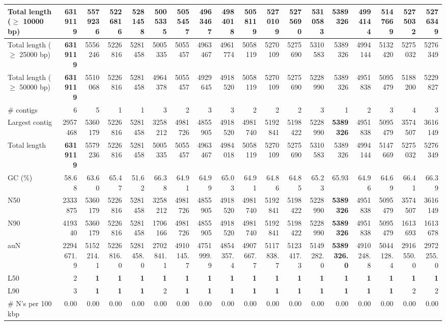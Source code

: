 \documentclass[12pt,a4paper]{article}
\begin{document}
\begin{table}[ht]
\begin{center}
\begin{tabular}{|l*{17}{|r}|}
Total length ($\geq$ 10000 bp) & {\bf 6319119} & 5579236 & 5226816 & 5281458 & 5005335 & 5055457 & 4963467 & 4984018 & 5058119 & 5270109 & 5275690 & 5310583 & 5389326 & 4994144 & 5147669 & 5275032 & 5276349 \\ \hline
Total length ($\geq$ 25000 bp) & {\bf 6319119} & 5556246 & 5226816 & 5281458 & 5005335 & 5055457 & 4963467 & 4961774 & 5058119 & 5270109 & 5275690 & 5310583 & 5389326 & 4994144 & 5132420 & 5275032 & 5276349 \\ \hline
Total length ($\geq$ 50000 bp) & {\bf 6319119} & 5510068 & 5226816 & 5281458 & 4964378 & 5055457 & 4929645 & 4918520 & 5058119 & 5270109 & 5275690 & 5228990 & 5389326 & 4951838 & 5095479 & 5188200 & 5229827 \\ \hline
\# contigs & 6 & 5 & 1 & 1 & 3 & 2 & 3 & 3 & 2 & 2 & 2 & 3 & 1 & 2 & 3 & 4 & 3 \\ \hline
Largest contig & 2957468 & 5360179 & 5226816 & 5281458 & 3258212 & 4981726 & 4855905 & 4918520 & 4981740 & 5192841 & 5198422 & 5228990 & {\bf 5389326} & 4951838 & 5095479 & 3574507 & 3616149 \\ \hline
Total length & {\bf 6319119} & 5579236 & 5226816 & 5281458 & 5005335 & 5055457 & 4963467 & 4984018 & 5058119 & 5270109 & 5275690 & 5310583 & 5389326 & 4994144 & 5147669 & 5275032 & 5276349 \\ \hline
GC (\%) & 58.68 & 63.60 & 65.47 & 51.62 & 66.38 & 64.91 & 64.99 & 65.03 & 64.91 & 64.86 & 64.85 & 65.23 & 65.93 & 64.96 & 64.69 & 66.41 & 66.39 \\ \hline
N50 & 2333875 & 5360179 & 5226816 & 5281458 & 3258212 & 4981726 & 4855905 & 4918520 & 4981740 & 5192841 & 5198422 & 5228990 & {\bf 5389326} & 4951838 & 5095479 & 3574507 & 3616149 \\ \hline
N90 & 419340 & 5360179 & 5226816 & 5281458 & 1706166 & 4981726 & 4855905 & 4918520 & 4981740 & 5192841 & 5198422 & 5228990 & {\bf 5389326} & 4951838 & 5095479 & 1613693 & 1613678 \\ \hline
auN & 2294671.9 & 5152214.1 & 5226816.0 & 5281458.0 & 2702841.1 & 4910145.7 & 4751999.9 & 4854357.4 & 4907667.7 & 5117838.7 & 5123417.3 & 5149282.0 & {\bf 5389326.0} & 4910248.8 & 5044128.4 & 2916550.0 & 2972255.0 \\ \hline
L50 & 2 & {\bf 1} & {\bf 1} & {\bf 1} & {\bf 1} & {\bf 1} & {\bf 1} & {\bf 1} & {\bf 1} & {\bf 1} & {\bf 1} & {\bf 1} & {\bf 1} & {\bf 1} & {\bf 1} & {\bf 1} & {\bf 1} \\ \hline
L90 & 3 & {\bf 1} & {\bf 1} & {\bf 1} & 2 & {\bf 1} & {\bf 1} & {\bf 1} & {\bf 1} & {\bf 1} & {\bf 1} & {\bf 1} & {\bf 1} & {\bf 1} & {\bf 1} & 2 & 2 \\ \hline
\# N's per 100 kbp & 0.00 & 0.00 & 0.00 & 0.00 & 0.00 & 0.00 & 0.00 & 0.00 & 0.00 & 0.00 & 0.00 & 0.00 & 0.00 & 0.00 & 0.00 & 0.00 & 0.00 \\ \hline
\end{tabular}
\end{center}
\end{table}
\end{document}
